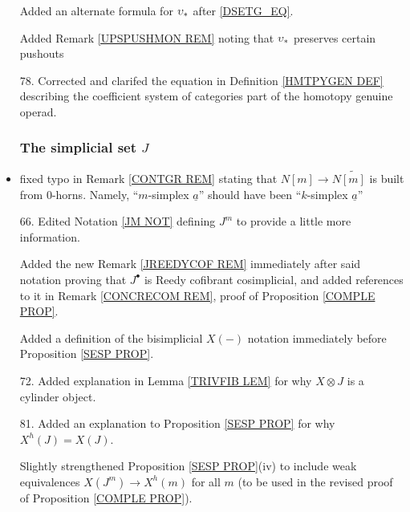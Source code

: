 \documentclass{article}
\begin{document}
\begin{itemize}
      Added an alternate formula for $\upsilon_{\**}$ after \eqref{DSETG_EQ}.
      
      Added Remark \ref{UPSPUSHMON REM} noting that $\upsilon_{\**}$ preserves certain pushouts %
      
      
\item[78.] Corrected and clarifed the equation in Definition \ref{HMTPYGEN DEF} describing the coefficient system of categories part of the homotopy genuine operad. %

      
      
      
      \subsubsection*{The simplicial set $J$}
\item fixed typo in Remark \ref{CONTGR REM} stating that $N[m] \to N \widetilde{[m]}$ is built from $0$-horns. Namely, ``$m$-simplex $\underline{a}$'' should have been ``$k$-simplex $\underline{a}$'' %

\item[66.] Edited Notation \ref{JM NOT} defining $J^m$ to provide a little more information.

Added the new Remark \ref{JREEDYCOF REM} immediately after said notation proving that $J^{\bullet}$ is Reedy cofibrant cosimplicial,
and added references to it in Remark \ref{CONCRECOM REM}, proof of Proposition \ref{COMPLE PROP}.

Added a definition of the bisimplicial $X(-)$ notation immediately before Proposition \ref{SESP PROP}.


\item[72.] Added explanation in Lemma \ref{TRIVFIB LEM} for why $X \otimes J$ is a cylinder object. %

\item[81.] Added an explanation to Proposition \ref{SESP PROP} for why $X^h(J) = X(J)$. %

      Slightly strengthened Proposition \ref{SESP PROP}(iv) to include weak equivalences $X(J^m) \to X^h(m)$ for all $m$ (to be used in the revised proof of Proposition \ref{COMPLE PROP}).

      
      

\end{itemize}
\end{document}
